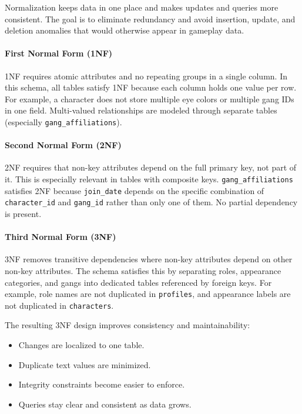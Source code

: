 Normalization keeps data in one place and makes updates and queries more
consistent. The goal is to eliminate redundancy and avoid insertion,
update, and deletion anomalies that would otherwise appear in gameplay
data.

\hypertarget{first-normal-form-1nf}{%
\paragraph{First Normal Form (1NF)}\label{first-normal-form-1nf}}

1NF requires atomic attributes and no repeating groups in a single
column. In this schema, all tables satisfy 1NF because each column holds
one value per row. For example, a character does not store multiple eye
colors or multiple gang IDs in one field. Multi-valued relationships are
modeled through separate tables (especially
\texttt{gang\_affiliations}).

\hypertarget{second-normal-form-2nf}{%
\paragraph{Second Normal Form (2NF)}\label{second-normal-form-2nf}}

2NF requires that non-key attributes depend on the full primary key, not
part of it. This is especially relevant in tables with composite keys.
\texttt{gang\_affiliations} satisfies 2NF because \texttt{join\_date}
depends on the specific combination of \texttt{character\_id} and
\texttt{gang\_id} rather than only one of them. No partial dependency is
present.

\hypertarget{third-normal-form-3nf}{%
\paragraph{Third Normal Form (3NF)}\label{third-normal-form-3nf}}

3NF removes transitive dependencies where non-key attributes depend on
other non-key attributes. The schema satisfies this by separating roles,
appearance categories, and gangs into dedicated tables referenced by
foreign keys. For example, role names are not duplicated in
\texttt{profiles}, and appearance labels are not duplicated in
\texttt{characters}.

The resulting 3NF design improves consistency and maintainability:

\begin{itemize}
\tightlist
\item
  Changes are localized to one table.
\item
  Duplicate text values are minimized.
\item
  Integrity constraints become easier to enforce.
\item
  Queries stay clear and consistent as data grows.
\end{itemize}

